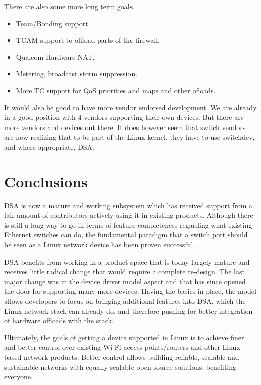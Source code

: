\documentclass[letterpaper]{article}
\begin{document}
There are also some more long term goals.

\begin{itemize}
\item Team/Bonding support.
\item TCAM support to offload parts of the firewall.
\item Qualcom Hardware NAT.
\item Metering, broadcast storm suppression.
\item More TC support for QoS priorities and maps and other ofloads.
\end{itemize}

It would also be good to have more vendor endorsed development. We are
already in a good position with 4 vendors supporting their own
devices. But there are more vendors and devices out there. It does
however seem that switch vendors are now realizing that to be part of
the Linux kernel, they have to use switchdev, and where appropriate,
DSA.

\section{Conclusions}

DSA is now a mature and working subsystem which has received support
from a fair amount of contributors actively using it in existing
products. Although there is still a long way to go in terms of feature
completeness regarding what existing Ethernet switches can do, the
fundamental paradigm that a switch port should be seen as a Linux
network device has been proven successful.

DSA benefits from working in a product space that is today largely
mature and receives little radical change that would require a
complete re-design.  The last major change was in the device driver
model aspect and that has since opened the door for supporting many
more devices. Having the basics in place, the model allows developers
to focus on bringing additional features into DSA, which the Linux
network stack can already do, and therefore pushing for better
integration of hardware offloads with the stack.

Ultimately, the goals of getting a device supported in Linux is to
achieve finer and better control over existing Wi-Fi access
points/routers and other Linux based network products. Better control
allows building reliable, scalable and sustainable networks with
equally scalable open source solutions, benefiting everyone.
\end{document}
